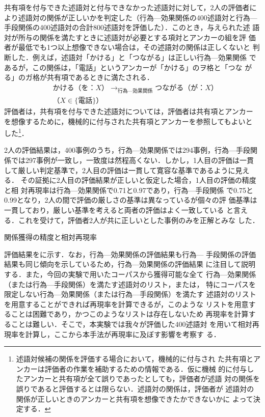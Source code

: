 \documentclass[japanese]{jnlp_1.4}
\begin{document}
共有項を付与できた述語対と付与できなかった述語対に対して，2人の評価者に
より述語対の関係が正しいかを判定した（行為—効果関係の400述語対と行為—
手段関係の400述語対の合計800述語対を評価した）．このとき，与えられた述
語対が所与の関係を満たすときに述語対が必要とする項対とアンカーの組を評
価者が最低でも1つ以上想像できない場合は，その述語対の関係は正しくないと
判断した．例えば，述語対「かける」と「つながる」は正しい行為—効果関係
であるが，この関係は，「電話」というアンカーが「かける」のヲ格と「つな
がる」のガ格が共有項であるときに満たされる．
\begin{align*}
  & かける（を：\mathit{X}） \rightarrow_{行為—効果関係} つながる（が：\mathit{X}）\\
  &（X \in \{電話\}）
\end{align*}
評価者は，共有項を付与できた述語対については，評価者は共有項とアンカー
を想像するために，機械的に付与された共有項とアンカーを参照してもよいと
した\footnote{述語対候補の関係を評価する場合において，機械的に付与され
  た共有項とアンカーは評価者の作業を補助するための情報である．仮に機械
  的に付与したアンカーと共有項が全て誤りであったとしても，評価者が述語
  対の関係を誤りであると評価するとは限らない．述語対の関係は，評価者が
  述語対の関係が正しいときのアンカーと共有項を想像できたかできないかに
  よって決定する．}．

2人の評価結果は，400事例のうち，行為—効果関係では294事例，行為—手段関
係では297事例が一致し，一致度は然程高くない．しかし，1人目の評価は一貫
して厳しい判定基準で，2人目の評価は一貫して寛容な基準であるように見える．
その証拠に2人目の評価結果が正しいと仮定した場合，1人目の評価の精度と相
対再現率は行為—効果関係で0.71と0.97であり，行為—手段関係
で0.75と0.99となり，2人の間で評価の厳しさの基準は異なっているが個々の評
価基準は一貫しており，厳しい基準を考えると両者の評価はよく一致している
と言える．これを受けて，評価者2人が共に正しいとした事例のみを正解とみな
した．

\begin{table}[b]
  \caption{関係獲得の精度と相対再現率}
  \label{tab:rel-prec}

\end{table}

評価結果をに示す．なお，行為—効果関係の評価結果も行為—
手段関係の評価結果も同じ傾向を示しているため，行為—効果関係の評価結果
に注目して説明する．また，今回の実験で用いたコーパスから獲得可能な全て
行為—効果関係（または行為—手段関係）を満たす述語対のリスト，または，
特にコーパスを限定しない行為—効果関係（または行為—手段関係）を満たす
述語対のリストを用意することができれば再現率を計算できるが，このような
リストを用意することは困難であり，かつこのようなリストは存在しないため
再現率を計算することは難しい．そこで，本実験では我々が評価した400述語対
を用いて相対再現率を計算し，ここから本手法が再現率に及ぼす影響を考察す
る．
\end{document}
